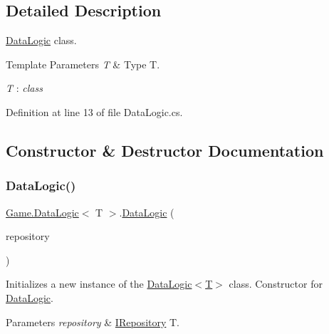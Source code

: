 \subsection{Detailed Description}
\mbox{\hyperlink{class_game_1_1_data_logic}{Data\+Logic}} class. 


\begin{DoxyTemplParams}{Template Parameters}
{\em T} & Type T.\\
\hline
\end{DoxyTemplParams}
\begin{Desc}
\item[Type Constraints]\begin{description}
\item[{\em T} : {\em class}]\end{description}
\end{Desc}


Definition at line 13 of file Data\+Logic.\+cs.



\subsection{Constructor \& Destructor Documentation}
\mbox{\label{class_game_1_1_data_logic_a137d81328f6aa97c7b1b79b8dd83e314}} 
\subsubsection{\texorpdfstring{DataLogic()}{DataLogic()}}
{\footnotesize\ttfamily \mbox{\hyperlink{class_game_1_1_data_logic}{Game.\+Data\+Logic}}$<$ T $>$.\mbox{\hyperlink{class_game_1_1_data_logic}{Data\+Logic}} (\begin{DoxyParamCaption}\item[{\mbox{\hyperlink{interface_game_1_1_i_repository}{I\+Repository}}$<$ T $>$}]{repository }\end{DoxyParamCaption})}



Initializes a new instance of the \mbox{\hyperlink{class_game_1_1_data_logic_a137d81328f6aa97c7b1b79b8dd83e314}{Data\+Logic$<$\+T$>$}} class. Constructor for \mbox{\hyperlink{class_game_1_1_data_logic}{Data\+Logic}}. 


\begin{DoxyParams}{Parameters}
{\em repository} & \mbox{\hyperlink{interface_game_1_1_i_repository}{I\+Repository}} T.\\
\hline
\end{DoxyParams}


